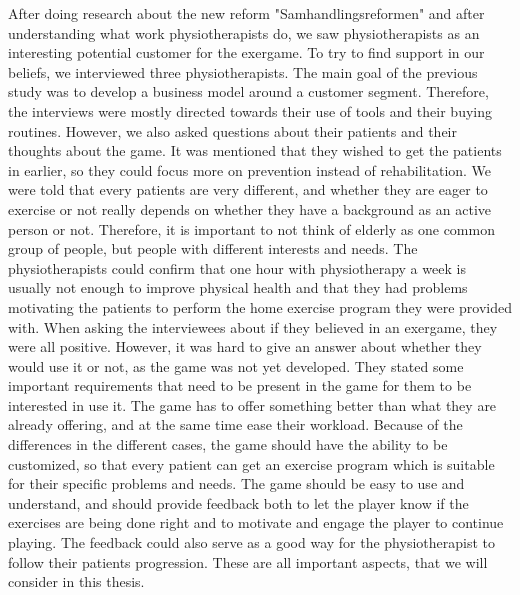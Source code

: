 After doing research about the new reform "Samhandlingsreformen" and after understanding what work physiotherapists do, we saw physiotherapists as an interesting potential customer for the exergame. To try to find support in our beliefs, we interviewed three physiotherapists. The main goal of the previous study was to develop a business model around a customer segment. Therefore, the interviews were mostly directed towards their use of tools and their buying routines. However, we also asked questions about their patients and their thoughts about the game. It was mentioned that they wished to get the patients in earlier, so they could focus more on prevention instead of rehabilitation. We were told that every patients are very different, and whether they are eager to exercise or not really depends on whether they have a background as an active person or not. Therefore, it is important to not think of elderly as one common group of people, but people with different interests and needs. The physiotherapists could confirm that one hour with physiotherapy a week is usually not enough to improve physical health and that they had problems motivating the patients to perform the home exercise program they were provided with. When asking the interviewees about if they believed in an exergame, they were all positive. However, it was hard to give an answer about whether they would use it or not, as the game was not yet developed. They stated some important requirements that need to be present in the game for them to be interested in use it. The game has to offer something better than what they are already offering, and at the same time ease their workload. Because of the differences in the different cases, the game should have the ability to be customized, so that every patient can get an exercise program which is suitable for their specific problems and needs. The game should be easy to use and understand, and should provide feedback both to let the player know if the exercises are being done right and to motivate and engage the player to continue playing. The feedback could also serve as a good way for the physiotherapist to follow their patients progression. These are all important aspects, that we will consider in this thesis. \\ \\
